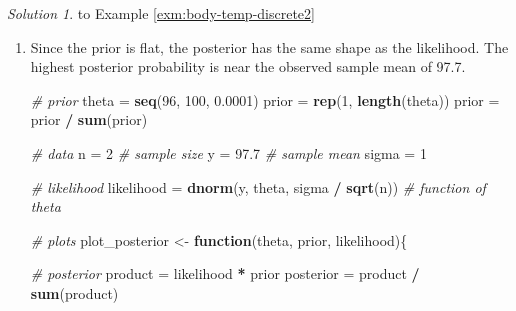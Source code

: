 \documentclass[
]{book}
\newenvironment{Shaded}{\begin{snugshade}}{\end{snugshade}}
\newcommand{\CommentTok}[1]{\textcolor[rgb]{0.56,0.35,0.01}{\textit{#1}}}
\newcommand{\ControlFlowTok}[1]{\textcolor[rgb]{0.13,0.29,0.53}{\textbf{#1}}}
\newcommand{\DecValTok}[1]{\textcolor[rgb]{0.00,0.00,0.81}{#1}}
\newcommand{\FloatTok}[1]{\textcolor[rgb]{0.00,0.00,0.81}{#1}}
\newcommand{\KeywordTok}[1]{\textcolor[rgb]{0.13,0.29,0.53}{\textbf{#1}}}
\newcommand{\NormalTok}[1]{#1}
\newcommand{\OperatorTok}[1]{\textcolor[rgb]{0.81,0.36,0.00}{\textbf{#1}}}
\newcommand{\StringTok}[1]{\textcolor[rgb]{0.31,0.60,0.02}{#1}}
\theoremstyle{definition}
\theoremstyle{definition}
\theoremstyle{definition}
\theoremstyle{remark}
\newtheorem*{solution}{Solution}
\begin{document}
\begin{solution}
{}to Example \ref{exm:body-temp-discrete2}
\end{solution}

\begin{enumerate}
\def\labelenumi{\arabic{enumi}.}
\item
  Since the prior is flat, the posterior has the same shape as the likelihood. The highest posterior probability is near the observed sample mean of 97.7.

\begin{Shaded}
\begin{Highlighting}[]
\CommentTok{\# prior}
\NormalTok{theta =}\StringTok{ }\KeywordTok{seq}\NormalTok{(}\DecValTok{96}\NormalTok{, }\DecValTok{100}\NormalTok{, }\FloatTok{0.0001}\NormalTok{)}
\NormalTok{prior =}\StringTok{ }\KeywordTok{rep}\NormalTok{(}\DecValTok{1}\NormalTok{, }\KeywordTok{length}\NormalTok{(theta))}
\NormalTok{prior =}\StringTok{ }\NormalTok{prior }\OperatorTok{/}\StringTok{ }\KeywordTok{sum}\NormalTok{(prior)}

\CommentTok{\# data}
\NormalTok{n =}\StringTok{ }\DecValTok{2} \CommentTok{\# sample size}
\NormalTok{y =}\StringTok{ }\FloatTok{97.7} \CommentTok{\# sample mean}
\NormalTok{sigma =}\StringTok{ }\DecValTok{1}

\CommentTok{\# likelihood}
\NormalTok{likelihood =}\StringTok{ }\KeywordTok{dnorm}\NormalTok{(y, theta, sigma }\OperatorTok{/}\StringTok{ }\KeywordTok{sqrt}\NormalTok{(n)) }\CommentTok{\# function of theta}

\CommentTok{\# plots}
\NormalTok{plot\_posterior \textless{}{-}}\StringTok{ }\ControlFlowTok{function}\NormalTok{(theta, prior, likelihood)\{}

  \CommentTok{\# posterior}
\NormalTok{  product =}\StringTok{ }\NormalTok{likelihood }\OperatorTok{*}\StringTok{ }\NormalTok{prior}
\NormalTok{  posterior =}\StringTok{ }\NormalTok{product }\OperatorTok{/}\StringTok{ }\KeywordTok{sum}\NormalTok{(product)}


\end{Highlighting}
\end{Shaded}
\end{enumerate}
\end{document}
